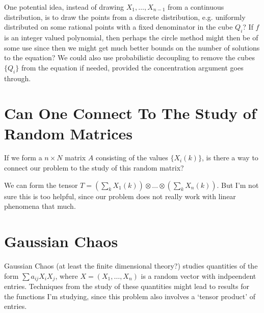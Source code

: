 \documentclass[dvipsnames,letterpaper,12pt]{article}
\numberwithin{equation}{section}
\numberwithin{theorem}{section}
\begin{document}
One potential idea, instead of drawing $X_1,\dots,X_{n-1}$ from a continuous distribution, is to draw the points from a discrete distribution, e.g. uniformly distributed on some rational points with a fixed denominator in the cube $Q_i$? If $f$ is an integer valued polynomial, then perhaps the circle method might then be of some use since then we might get much better bounds on the number of solutions to the equation? We could also use probabilistic decoupling to remove the cubes $\{ Q_i \}$ from the equation if needed, provided the concentration argument goes through.

\section{Can One Connect To The Study of Random Matrices}

If we form a $n \times N$ matrix $A$ consisting of the values $\{ X_i(k) \}$, is there a way to connect our problem to the study of this random matrix?

We can form the tensor $T = \left( \sum_k X_1(k) \right) \otimes \dots \otimes \left( \sum_k X_n(k) \right)$. But I'm not sure this is too helpful, since our problem does not really work with linear phenomena that much.

\section{Gaussian Chaos}

Gaussian Chaos (at least the finite dimensional theory?) studies quantities of the form $\sum a_{ij} X_i X_j$, where $X = (X_1, \dots, X_n)$ is a random vector with indpeendent entries. Techniques from the study of these quantities might lead to results for the functions I'm studying, since this problem also involves a `tensor product' of entries.
\end{document}
